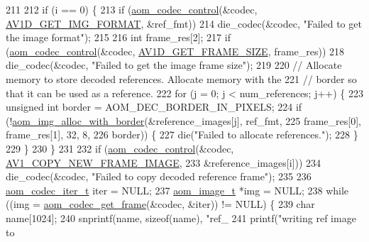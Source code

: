\begin{DoxyCodeInclude}
{{{{211 
212     \textcolor{keywordflow}{if} (i == 0) \{
213       \textcolor{keywordflow}{if} (\hyperlink{group__codec_ga6da974f4eeaba1fa74106b28d0fe6ac5}{aom\_codec\_control}(&codec, \hyperlink{group__aom__decoder_gga3865fd4b3192489baa9a5c3632ebe97bacd7229e5fb766670fe995739931c2ee3}{AV1D\_GET\_IMG\_FORMAT}, &ref\_fmt))
214         die\_codec(&codec, \textcolor{stringliteral}{"Failed to get the image format"});
215 
216       \textcolor{keywordtype}{int} frame\_res[2];
217       \textcolor{keywordflow}{if} (\hyperlink{group__codec_ga6da974f4eeaba1fa74106b28d0fe6ac5}{aom\_codec\_control}(&codec, \hyperlink{group__aom__decoder_gga3865fd4b3192489baa9a5c3632ebe97ba175c454a7adf2d3927a0e979b4a2b07b}{AV1D\_GET\_FRAME\_SIZE}, frame\_res))
218         die\_codec(&codec, \textcolor{stringliteral}{"Failed to get the image frame size"});
219 
220       \textcolor{comment}{// Allocate memory to store decoded references. Allocate memory with the}
221       \textcolor{comment}{// border so that it can be used as a reference.}
222       \textcolor{keywordflow}{for} (j = 0; j < num\_references; j++) \{
223         \textcolor{keywordtype}{unsigned} \textcolor{keywordtype}{int} border = AOM\_DEC\_BORDER\_IN\_PIXELS;
224         \textcolor{keywordflow}{if} (!\hyperlink{aom__image_8h_aeb211e5184687f7e10d7c5bed4dcfdcd}{aom\_img\_alloc\_with\_border}(&reference\_images[j], ref\_fmt,
225                                        frame\_res[0], frame\_res[1], 32, 8,
226                                        border)) \{
227           die(\textcolor{stringliteral}{"Failed to allocate references."});
228         \}
229       \}
230     \}
231 
232     \textcolor{keywordflow}{if} (\hyperlink{group__codec_ga6da974f4eeaba1fa74106b28d0fe6ac5}{aom\_codec\_control}(&codec, \hyperlink{group__aom_gga9421a1fa78c0d9587ae5aa6c1cb3d659ae41763622ee33cd99e23ca8f78a3f8fa}{AV1\_COPY\_NEW\_FRAME\_IMAGE},
233                           &reference\_images[i]))
234       die\_codec(&codec, \textcolor{stringliteral}{"Failed to copy decoded reference frame"});
235 
236     \hyperlink{group__codec_gadf9e173c9e02788a9999399edab20a02}{aom\_codec\_iter\_t} iter = NULL;
237     \hyperlink{structaom__image}{aom\_image\_t} *img = NULL;
238     \textcolor{keywordflow}{while} ((img = \hyperlink{group__decoder_ga780aad27a2728abefab725faa3bc4f79}{aom\_codec\_get\_frame}(&codec, &iter)) != NULL) \{
239       \textcolor{keywordtype}{char} name[1024];
240       snprintf(name, \textcolor{keyword}{sizeof}(name), \textcolor{stringliteral}{"ref\_%
241       printf(\textcolor{stringliteral}{"writing ref image to %
}}}}}}
\end{DoxyCodeInclude}
